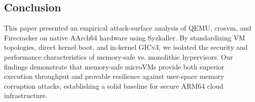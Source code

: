 \documentclass{article}
\begin{document}
\subsection{Conclusion}
This paper presented an empirical attack-surface analysis of QEMU, crosvm, and Firecracker on native AArch64 hardware using Syzkaller. By standardizing VM topologies, direct kernel boot, and in-kernel GICv3, we isolated the security and performance characteristics of memory-safe vs. monolithic hypervisors. Our findings demonstrate that memory-safe microVMs provide both superior execution throughput and provable resilience against user-space memory corruption attacks, establishing a solid baseline for secure ARM64 cloud infrastructure.



\end{document}
